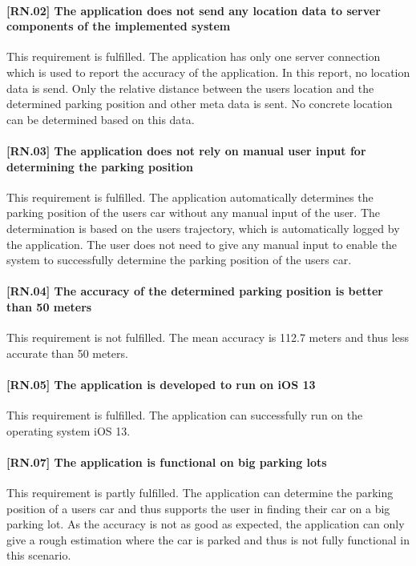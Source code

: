 \paragraph{[RN.02] The application does not send any location data to server components of the implemented system}
This requirement is fulfilled. The application has only one server connection which is used to report the accuracy of the application. In this report, no location data is send. Only the relative distance between the users location and the determined parking position and other meta data is sent. No concrete location can be determined based on this data.

\paragraph{[RN.03] The application does not rely on manual user input for determining the parking position}
This requirement is fulfilled. The application automatically determines the parking position of the users car without any manual input of the user. The determination is based on the users trajectory, which is automatically logged by the application. The user does not need to give any manual input to enable the system to successfully determine the parking position of the users car. 

\paragraph{[RN.04] The accuracy of the determined parking position is better than 50 meters}
This requirement is not fulfilled. The mean accuracy is 112.7 meters and thus less accurate than 50 meters. 

\paragraph{[RN.05] The application is developed to run on iOS 13}
This requirement is fulfilled. The application can successfully run on the operating system iOS 13.

\paragraph{[RN.07] The application is functional on big parking lots}
This requirement is partly fulfilled. The application can determine the parking position of a users car and thus supports the user in finding their car on a big parking lot. As the accuracy is not as good as expected, the application can only give a rough estimation where the car is parked and thus is not fully functional in this scenario.

